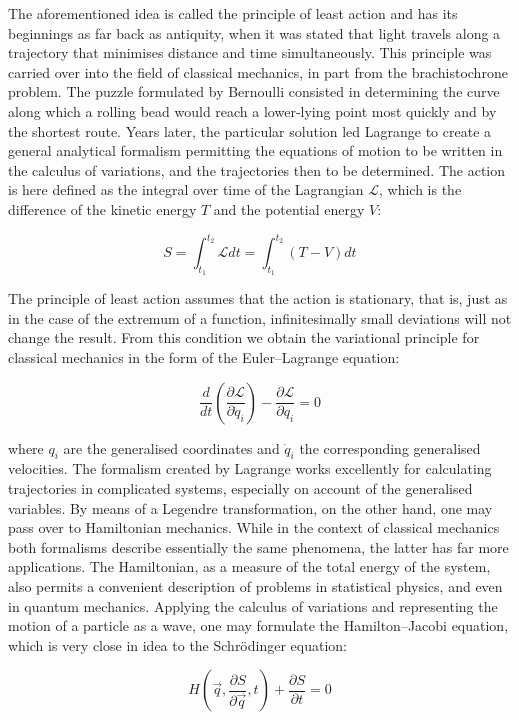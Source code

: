 The aforementioned idea is called the principle of least action and has its beginnings as far back as antiquity, when it was stated that light travels along a trajectory that minimises distance and time simultaneously. This principle was carried over into the field of classical mechanics, in part from the brachistochrone problem. The puzzle formulated by Bernoulli consisted in determining the curve along which a rolling bead would reach a lower-lying point most quickly and by the shortest route. Years later, the particular solution led Lagrange to create a general analytical formalism permitting the equations of motion to be written in the calculus of variations, and the trajectories then to be determined. The action is here defined as the integral over time of the Lagrangian $\mathcal{L}$, which is the difference of the kinetic energy $T$ and the potential energy $V$:

\[
S = \int_{t_1}^{t_2}\mathcal{L}dt = \int_{t_1}^{t_2}(T-V)dt
\]

The principle of least action assumes that the action is stationary, that is, just as in the case of the extremum of a function, infinitesimally small deviations will not change the result. From this condition we obtain the variational principle for classical mechanics in the form of the Euler--Lagrange equation:

\[
\frac{d}{dt}\left(\frac{\partial \mathcal{L}}{\partial \dot q_i}\right) - \frac{\partial\mathcal{L}}{\partial q_i} = 0
\]

where $q_i$ are the generalised coordinates and $\dot q_i$ the corresponding generalised velocities. The formalism created by Lagrange works excellently for calculating trajectories in complicated systems, especially on account of the generalised variables. By means of a Legendre transformation, on the other hand, one may pass over to Hamiltonian mechanics. While in the context of classical mechanics both formalisms describe essentially the same phenomena, the latter has far more applications. The Hamiltonian, as a measure of the total energy of the system, also permits a convenient description of problems in statistical physics, and even in quantum mechanics. Applying the calculus of variations and representing the motion of a particle as a wave, one may formulate the Hamilton--Jacobi equation, which is very close in idea to the Schrödinger equation:

\[
H \left( \vec{q}, \frac{\partial S}{\partial \vec{q}}, t \right) + \frac{\partial S}{\partial t} = 0
\]

